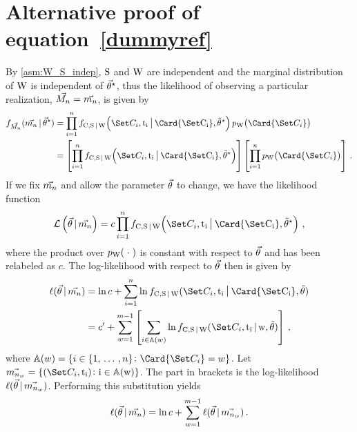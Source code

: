 \documentclass[../main.tex]{subfiles}
\begin{document}
\chapter{Alternative proof of equation~\ref{dummyref}}
By \cref{asm:W_S_indep}, $\mathrm{S}$ and $\mathrm{W}$ are independent and the marginal distribution of $\mathrm{W}$ is independent of ${\vec{\theta}}^{\star}$, thus the likelihood of observing a particular realization, $\vec{M_n} = \vec{m_n}$, is given by
\begin{equation}
\begin{split}
    \pdf_{\mfs}(\mfso \given \tparam{\sysparamvec})
        &= \prod_{i=1}^{n} \jointpdf\!\left(\cand_i, \ti_i \mathlarger{\given} \Card{\cand_i}, \tparam\sysparamvec\right) \pmf_{\RV{W}}\!\left(\Card{\cand_i}\right)\\
        &= \left[\prod_{i=1}^{n} \jointpdf\!\left(\cand_i, \ti_i \mathlarger{\given} \Card{\cand_i}, \tparam\sysparamvec\right)\right]\left[\prod_{i=1}^{n} \pmf_{\RV{W}}\!\left(\Card{\cand_i}\right)\right]\,.
\end{split}
\end{equation}
If we fix $\vec{m_n}$ and allow the parameter $\vec{\theta}$ to change, we have the likelihood function
\begin{equation}
    \likelihood\left(\sysparamvec \given \mfso\right) = c \prod_{i=1}^{n} \jointpdf\!\left(\cand_i, \ti_i \mathlarger{\given} \Card{\cand_i}, \tparam\sysparamvec\right)\,,
\end{equation}
where the product over $p_{\mathrm{W}}(\;\cdot\;)$ is constant with respect to $\vec{\theta}$ and has been relabeled as $c$. The log-likelihood with respect to $\vec{\theta}$ then is given by
\begin{equation}
\begin{split}
    \ell(\sysparamvec \given \mfso)
        &= \ln c + \sum_{i=1}^{n} \ln \jointpdf(\cand_i,\ti_i \mathlarger{\given} \Card{\cand_i}, \sysparamvec)\\
        &= c' + \sum_{w=1}^{m-1} \left[\sum_{i \in \mathbb{A}(w)}\ln \jointpdf(\cand_i,\ti_i \given w, \sysparamvec)\right]\,,
\end{split}
\end{equation}
where $\mathbb{A}(w) = \{i \in \{1,\,\ldots\,,n\} \colon \Card{\cand_i} = w\}$. Let $\mfsoi{n_w} = \{(\cand_i, \ti_i) \colon i \in \mathbb{A}(w)\}$. The part in brackets is the log-likelihood $\ell(\vec{\theta} {\,|\,} \vec{m_{n_w}})$. Performing this substitution yields
\begin{equation}
    \ell(\vec{\theta} {\,|\,} \vec{m_n}) = \ln c + \sum_{w=1}^{m-1} \ell(\vec{\theta} {\,|\,} \vec{m_{n_w}})\,.
\end{equation}
\end{document}
